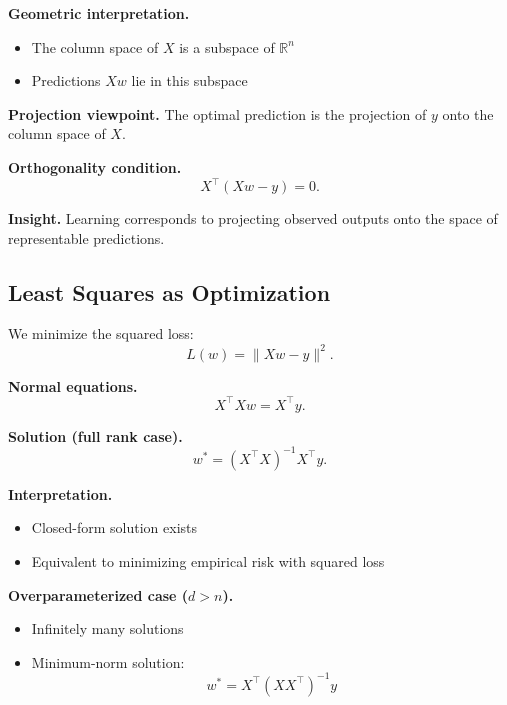 \medskip

\noindent
\textbf{Geometric interpretation.}

\begin{itemize}
    \item The column space of $X$ is a subspace of $\mathbb{R}^n$
    \item Predictions $Xw$ lie in this subspace
\end{itemize}

\medskip

\noindent
\textbf{Projection viewpoint.}  
The optimal prediction is the projection of $y$ onto the column space of $X$.

\medskip

\noindent
\textbf{Orthogonality condition.}
\[
X^\top (Xw - y) = 0.
\]

\medskip

\noindent
\textbf{Insight.}  
Learning corresponds to projecting observed outputs onto the space of representable predictions.

\subsection{Least Squares as Optimization}

We minimize the squared loss:
\[
L(w) = \|Xw - y\|^2.
\]

\medskip

\noindent
\textbf{Normal equations.}
\[
X^\top X w = X^\top y.
\]

\medskip

\noindent
\textbf{Solution (full rank case).}
\[
w^* = (X^\top X)^{-1} X^\top y.
\]

\medskip

\noindent
\textbf{Interpretation.}
\begin{itemize}
    \item Closed-form solution exists
    \item Equivalent to minimizing empirical risk with squared loss
\end{itemize}

\medskip

\noindent
\textbf{Overparameterized case ($d > n$).}
\begin{itemize}
    \item Infinitely many solutions
    \item Minimum-norm solution:
    \[
    w^* = X^\top (XX^\top)^{-1} y
    \]
\end{itemize}

